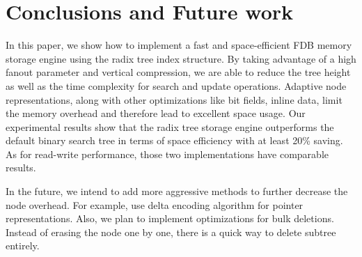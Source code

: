 \documentclass[sigplan,screen,nonacm]{acmart}
\begin{document}
\section{Conclusions and Future work}
In this paper, we show how to implement a fast and space-efficient FDB memory storage engine using the radix tree index structure. By taking advantage of a high fanout parameter and vertical compression, we are able to reduce the tree height as well as the time complexity for search and update operations. Adaptive node representations, along with other optimizations like bit fields, inline data, limit the memory overhead and therefore lead to excellent space usage. Our experimental results show that the radix tree storage engine outperforms the default binary search tree in terms of space efficiency with at least 20\% saving. As for read-write performance, those two implementations have comparable results. 

In the future, we intend to add more aggressive methods to further decrease the node overhead. For example, use delta encoding algorithm for pointer representations. Also, we plan to implement optimizations for bulk deletions. Instead of erasing the node one by one, there is a quick way to delete subtree entirely.   



\end{document}
